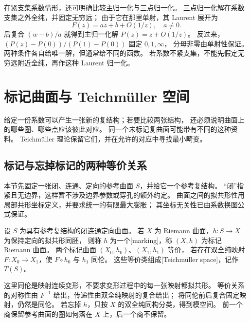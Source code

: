 \ProseParagraphBreak

在紧支集系数情形，还可明确比较主归一化与三点归一化。
三点归一化解在系数支集之外全纯，并固定无穷远；
由于它在那里单射，其 Laurent 展开为
\[
 F(z)=az+b+O(1/z),\quad a\ne0.
\]
后复合 \((w-b)/a\) 就得到主归一化解 \(P(z)=z+O(1/z)\)。
反过来，\((P(z)-P(0))/(P(1)-P(0))\) 固定 \(0,1,\infty\)，
分母非零由单射性保证。
两种条件各自给唯一解，但通常给不同的函数。
若系数不紧支集，不能先假定无穷远附近全纯，再作这种 Laurent 归一化。

\section{标记曲面与 Teichmüller 空间}
\label{b3:sec:B05}

给定一份系数可以产生一张新的复结构；若要比较两张结构，
还必须说明曲面上的哪些圈、哪些点应该彼此对应。
同一个未标记复曲面可能带有不同的这种资料。
Teichmüller 理论保留它们，并在允许的对应中寻找最小畸变。

\subsection{标记与忘掉标记的两种等价关系}
\label{b3:subsec:B0501}

本节先固定一张闭、连通、定向的参考曲面 \(S\)，并给它一个参考复结构。
“闭”指紧且无边界，这样暂不涉及边界参数或穿孔的额外约定。
曲面之间的拟共形性用局部共形坐标定义，并要求统一的有限最大膨胀；
其坐标无关性已由系数换图公式保证。

\begin{definition}\label{b3:def:B-marked-space}
设 \(S\) 为具有参考复结构的闭连通定向曲面。
若 \(X\) 为 Riemann 曲面，\(h:S\rightarrow X\) 为保持定向的拟共形同胚，
则称 \(h\) 为一个[marking]，称 \((X,h)\) 为标记 Riemann 曲面。
两个标记曲面 \((X_0,h_0)\)、\((X_1,h_1)\) 等价，
若存在双全纯映射 \(F:X_0\rightarrow X_1\)，使 \(F\circ h_0\) 与 \(h_1\) 同伦。
这些等价类组成[Teichmüller space]，记作 \(T(S)\)。
\end{definition}
这里同伦是映射连续变形，不要求变形过程中的每一张映射都拟共形。
等价关系的对称性由 \(F^{-1}\) 给出，传递性由双全纯映射的复合给出；
将同伦前后复合固定映射，仍然是同伦。
若忘掉 \(h\)，只按 \(X\) 的双全纯同构分类，得到模空间。
前一个商保留参考曲面的圈如何落在 \(X\) 上，后一个商不保留。

\ProseParagraphBreak

